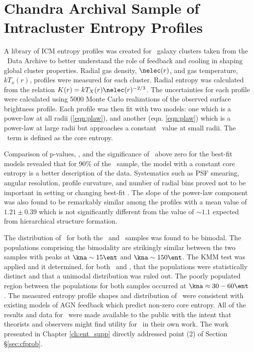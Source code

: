 \section{Chandra Archival Sample of Intracluster Entropy Profiles}

A library of ICM entropy profiles was created for \entsuppnum\ galaxy
clusters taken from the \chandra\ Data Archive to better understand
the role of feedback and cooling in shaping global cluster
properties. Radial gas density, $\nelec(r)$, and gas temperature,
$kT_x(r)$, profiles were measured for each cluster. Radial entropy was
calculated from the relation $K(r)=kT_X(r)\nelec(r)^{-2/3}$. The
uncertainties for each profile were calculated using 5000 Monte Carlo
realizations of the observed surface brightness profile. Each profile
was then fit with two models: one which is a power-law at all radii
(\ref{eqn:plaw}), and another (eqn. \ref{eqn:plaw}) which is a
power-law at large radii but approaches a constant \kna\ value at
small radii. The \kna\ term is defined as the core entropy.

Comparison of p-values, \chisq, and the significance of \kna\ above
zero for the best-fit models revealed that for 90\% of the
\entsuppnum\ sample, the model with a constant core entropy is a
better description of the data. Systematics such as PSF smearing,
angular resolution, profile curvature, and number of radial bins
proved not to be important in setting or changing best-fit \kna. The
slope of the power-law component was also found to be remarkably
similar among the profiles with a mean value of $1.21 \pm 0.39$ which
is not significantly different from the value of $\sim1.1$ expected
from hierarchical structure formation.

The distribution of \kna\ for both the \accept\ and \hifl\ samples was
found to be bimodal. The populations comprising the bimodality are
strikingly similar between the two samples with peaks at $\kna \sim 15
\ent$ and $\kna \sim 150 \ent$. The KMM test \citep{kmm1,kmm2} was
applied and it determined, for both \accept\ and \hifl, that the
populations were statistically distinct and that a unimodal
distribution was ruled out. The poorly populated region between the
populations for both samples occurred at $\kna \approx 30-60
\ent$. The measured entropy profile shapes and distribution of \kna\
were consistent with existing models of AGN feedback which predict
non-zero core entropy. All of the results and data for \accept\ were
made available to the public with the intent that theorists and
observers might find utility for
\accept\ in their own work. The work presented in Chapter
\ref{ch:ent_supp} directly addressed point (2) of Section
\S\ref{sec:cfprob}.

